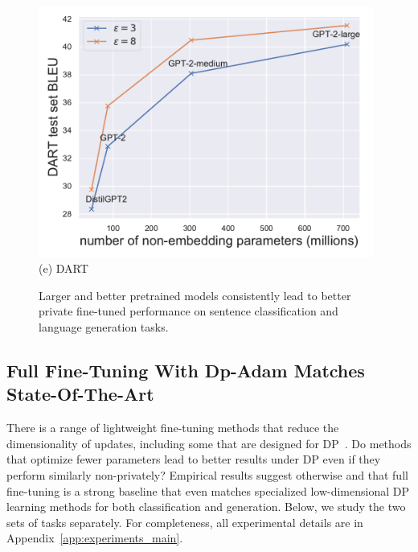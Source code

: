 \begin{figure}[ht]
\begin{center}
\begin{minipage}[t]{0.45\linewidth}
\centering
{\includegraphics[width=0.98\textwidth]{figs/dart_scaling_BLEU.pdf}}
(e) DART
\end{minipage}
\end{center}

\caption{
Larger and better pretrained models consistently lead to better private fine-tuned performance on sentence classification and language generation tasks.
}
\label{fig:fig1_extension}
\end{figure}

\subsection{Full Fine-Tuning With Dp-Adam Matches State-Of-The-Art}\label{sec:experiments_main}
There is a range of lightweight fine-tuning methods that reduce the dimensionality of updates, including some that are designed for DP~\citep{yu2021large}.
Do methods that optimize fewer parameters lead to better results under DP even if they perform similarly non-privately? Empirical results suggest otherwise and that full fine-tuning is a strong baseline that even matches specialized low-dimensional DP learning methods for both classification and generation.
Below, we study the two sets of tasks separately. 
For completeness, all experimental details are in Appendix~\ref{app:experiments_main}.

